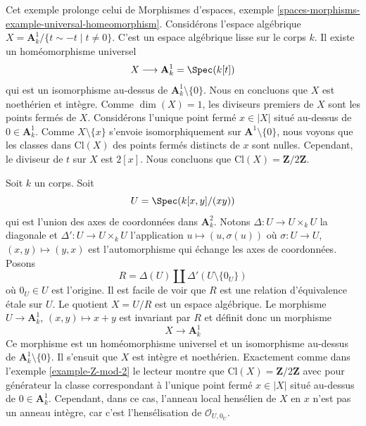 \begin{example}
\label{example-Z-mod-2}
Cet exemple prolonge celui de Morphismes d'espaces,
exemple \ref{spaces-morphisms-example-universal-homeomorphism}.
Considérons l'espace algébrique
$X = \mathbf{A}^1_k/\{t \sim -t \mid t \not = 0\}$.
C'est un espace algébrique lisse sur le corps $k$.
Il existe un homéomorphisme universel
$$
X \longrightarrow \mathbf{A}^1_k = \Spec(k[t])
$$
qui est un isomorphisme au-dessus de $\mathbf{A}^1_k \setminus \{0\}$.
Nous en concluons que $X$ est noethérien et intègre.
Comme $\dim(X) = 1$, les diviseurs premiers de $X$ sont
les points fermés de $X$.
Considérons l'unique point fermé $x \in |X|$ situé au-dessus de $0 \in \mathbf{A}^1_k$.
Comme $X \setminus \{x\}$ s'envoie isomorphiquement sur $\mathbf{A}^1 \setminus \{0\}$,
nous voyons que les classes dans $\text{Cl}(X)$ des points fermés distincts
de $x$ sont nulles. Cependant, le diviseur de $t$ sur $X$ est $2[x]$.
Nous concluons que $\text{Cl}(X) = \mathbf{Z}/2\mathbf{Z}$.
\end{example}

\begin{example}
\label{example-not-a-domain}
Soit $k$ un corps. Soit
$$
U = \Spec(k[x, y]/(xy))
$$
qui est l'union des axes de coordonnées dans $\mathbf{A}^2_k$.
Notons $\Delta : U \to U \times_k U$ la diagonale et
$\Delta' : U \to U \times_k U$ l'application $u \mapsto (u, \sigma(u))$
où $\sigma : U \to U$, $(x, y) \mapsto (y, x)$
est l'automorphisme qui échange les axes de coordonnées. Posons
$$
R = \Delta(U) \amalg \Delta'(U \setminus \{0_U\})
$$
où $0_U \in U$ est l'origine. Il est facile de voir que
$R$ est une relation d'équivalence \'etale sur $U$. Le quotient $X = U/R$
est un espace algébrique. Le morphisme $U \to \mathbf{A}^1_k$,
$(x, y) \mapsto x + y$ est invariant par $R$ et définit donc
un morphisme
$$
X \longrightarrow \mathbf{A}^1_k
$$
Ce morphisme est un homéomorphisme universel et un isomorphisme au-dessus de
$\mathbf{A}^1_k \setminus \{0\}$. Il s'ensuit que $X$ est intègre
et noethérien. Exactement comme dans l'exemple \ref{example-Z-mod-2}
le lecteur montre que $\text{Cl}(X) = \mathbf{Z}/2\mathbf{Z}$
avec pour générateur la classe correspondant à l'unique point fermé $x \in |X|$
situé au-dessus de $0 \in \mathbf{A}^1_k$. Cependant, dans ce cas, l'anneau local hensélien
de $X$ en $x$ n'est pas un anneau intègre, car c'est l'hensélisation
de $\mathcal{O}_{U, 0_U}$.
\end{example}














